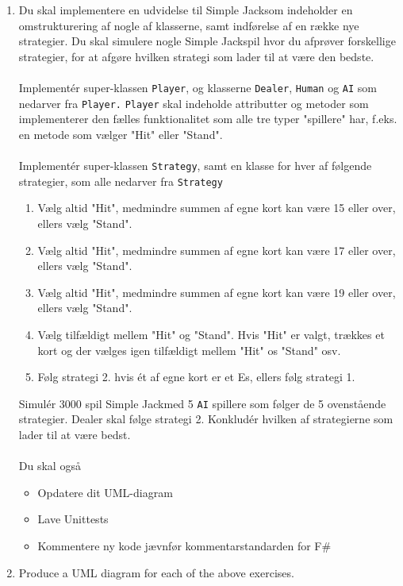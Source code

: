 \documentclass[a4paper,12pt]{article}
\newcommand{\sbl}{Simple Jack}
\begin{document}
\begin{enumerate}[label=11ø.\arabic*,start=0]
\item Du skal implementere en udvidelse til \sbl som indeholder en omstrukturering af nogle af klasserne, samt indførelse af en række nye strategier. Du skal simulere nogle \sbl spil hvor du afprøver forskellige strategier, for at afgøre
  hvilken strategi som lader til at være den bedste. \\ \\
  Implement\'{e}r super-klassen \texttt{Player}, og klasserne \texttt{Dealer}, \texttt{Human} og \texttt{AI} som nedarver fra \texttt{Player.} \texttt{Player} skal indeholde attributter og metoder som implementerer den fælles funktionalitet
  som alle tre typer "spillere" har, f.eks. en metode som vælger "Hit" eller "Stand". \\ \\
  Implement\'{e}r super-klassen \texttt{Strategy}, samt en klasse for hver af følgende strategier, som alle nedarver fra \texttt{Strategy}
  \begin{enumerate}
  \item Vælg altid "Hit", medmindre summen af egne kort kan være 15 eller over, ellers vælg "Stand".
  \item Vælg altid "Hit", medmindre summen af egne kort kan være 17 eller over, ellers vælg "Stand".
  \item Vælg altid "Hit", medmindre summen af egne kort kan være 19 eller over, ellers vælg "Stand".
  \item Vælg tilfældigt mellem "Hit" og "Stand". Hvis "Hit" er valgt, trækkes et kort og der vælges igen tilfældigt mellem
    "Hit" os "Stand" osv.
  \item Følg strategi 2. hvis \'{e}t af egne kort er et Es, ellers følg strategi 1.
  \end{enumerate}
  Simul\'{e}r 3000 spil \sbl med 5 \texttt{AI} spillere som følger de 5 ovenstående strategier.
  Dealer skal følge strategi 2. 
  Konklud\'{e}r hvilken af strategierne som lader til at være bedst. \\ \\
  Du skal også
  \begin{itemize}
  \item Opdatere dit UML-diagram
  \item Lave Unittests
  \item Kommentere ny kode jævnfør kommentarstandarden for F\#
  \end{itemize}
  
\item Produce a UML diagram for each of the above exercises.
  
\end{enumerate}
\end{document}
